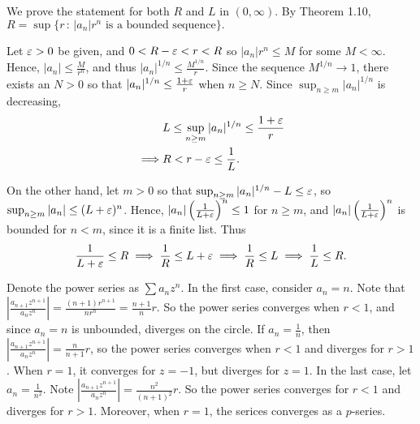 \documentclass{homework}
\begin{document}

\begin{solution}
  We prove the statement for both $R$ and $L$ in $(0,\infty)$.  By Theorem
  1.10, $R = \sup\{r\,:\,|a_n|r^n\text{ is a bounded sequence}\}.$ 

  Let $\varepsilon>0$ be given, and \mbox{$0<R-\varepsilon<r<R$} so $|a_n|r^n \le M$ for some $M<\infty$.
  Hence, $|a_n| \le \frac M{r^n}$, and thus $|a_n|^{1/n} \le \frac {M^{1/n}}r$.
  Since the sequence $M^{1/n}\to 1$, there exists an $N>0$ so that $|a_n|^{1/n}
  \le \frac {1+\varepsilon}r$ when $n\ge N$.  
  Since $\sup_{n\ge m}|a_n|^{1/n}$ is decreasing, 
  \begin{align*}
    &L\le\sup_{n\ge m}|a_n|^{1/n} \le \frac{1+\varepsilon}r\\
    \implies& R < r - \varepsilon \le \frac 1L.\\
  \end{align*}

  On the other hand, let $m>0$ so that $\sup_{n\ge m}|a_n|^{1/n} - L\le\varepsilon$, so $\sup_{n\ge m}|a_n| \le (L+\varepsilon)^n$.  Hence, $|a_n|\left(\frac 1{L+\varepsilon}\right)^n \le 1$ for $n\ge m$, and $|a_n|\left(\frac 1{L+\varepsilon}\right)^n$ is bounded for $n< m$, since it is a finite list. Thus
  $$
    \frac 1{L+\varepsilon} \le R \implies \frac 1R \le L + \varepsilon \implies \frac 1R \le L \implies \frac 1L \le R.
  $$
\end{solution}


\begin{solution}
  Denote the power series as $\sum a_n z^n$.  In the first case, consider $a_n
  = n$. Note that $|\frac{ a_{n+1} z^{n+1}}{a_nz^n} | = \frac{(n+1) r^{n+1}}{nr^n} = \frac{n+1}{n}r$.  So the power series
  converges when $r<1$, and since $a_n = n$ is unbounded, diverges on the circle.  If $a_n = \frac 1n$, then 
  $|\frac{ a_{n+1} z^{n+1}}{a_n z^n}| = \frac{n}{n+1} r$, so the power series converges when $r < 1$ and diverges for $r >1$. When $r = 1$, it converges for $z=-1$, but diverges for $z=1$. In the last case, let $a_n = \frac 1{n^2}$.  Note $|\frac{a_{n+1}z^{n+1}}{a_nz^n}| = \frac{n^2}{(n+1)^2} r$. So the power series converges for $r<1$ and diverges for $r>1$.  Moreover, when $r=1$, the serices converges as a $p$-series.

\end{solution}
\end{document}
